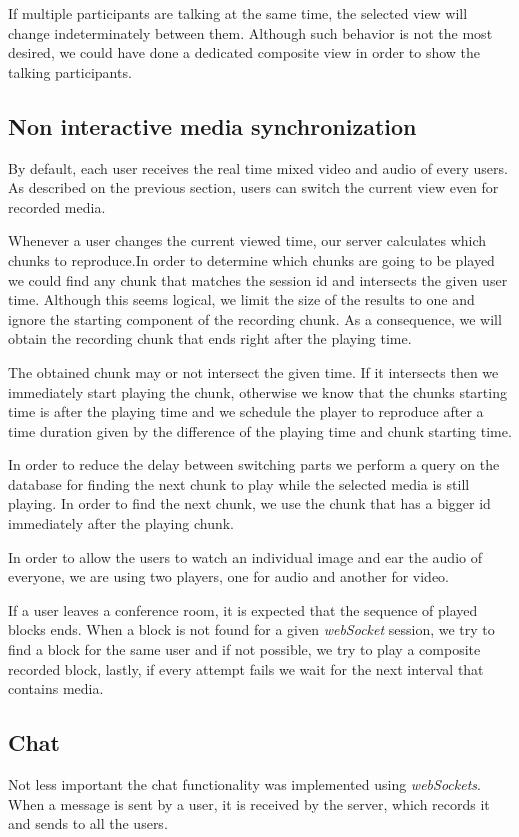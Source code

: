 		If multiple participants are talking at the same time, the selected view will change indeterminately between them. Although such behavior is not the most desired, we could have done a dedicated composite view in order to show the talking participants. 

\subsection{Non interactive media synchronization}
		By default, each user receives the real time mixed video and audio of every users. As described on the previous section, users can switch the current view even for recorded media.

		Whenever a user changes the current viewed time, our server calculates which chunks to reproduce.In order to determine which chunks are going to be played we could find any chunk that matches the session id and intersects the given user time. Although this seems logical, we limit the size of the results to one and ignore the starting component of the recording chunk. As a consequence, we will obtain the recording chunk that ends right after the playing time.

		The obtained chunk may or not intersect the given time. If it intersects then we immediately start playing the chunk, otherwise we know that the chunks starting time is after the playing time and we schedule the player to reproduce after a time duration given by the difference of the playing time and chunk starting time.

		In order to reduce the delay between switching parts we perform a query on the database for finding the next chunk to play while the selected media is still playing. In order to find the next chunk, we use the chunk that has a bigger id immediately after the playing chunk.

		In order to allow the users to watch an individual image and ear the audio of everyone, we are using two players, one for audio and another for video. 

		If a user leaves a conference room, it is expected that the sequence of played blocks ends. When a block is not found for a given \emph{webSocket} session, we try to find a block for the same user and if not possible, we try to play a composite recorded block, lastly, if every attempt fails we wait for the next interval that contains media.

\subsection{Chat}
		Not less important the chat functionality was implemented using \emph{webSockets}. When a message is sent by a user, it is received by the server, which records it and sends to all the users.

